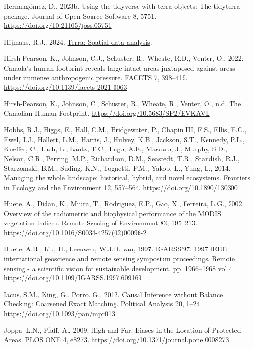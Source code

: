 \documentclass[
]{agujournal2019}
\newlength{\cslhangindent}
\newenvironment{CSLReferences}[2] %
 {\begin{list}{}{%
  \setlength{\itemindent}{0pt}
  \setlength{\leftmargin}{0pt}
  \setlength{\parsep}{0pt}
  \ifodd #1
   \setlength{\leftmargin}{\cslhangindent}
   \setlength{\itemindent}{-1\cslhangindent}
  \fi
  \setlength{\itemsep}{#2\baselineskip}}}
 {\end{list}}
\begin{document}
\begin{CSLReferences}{1}{0}
Hernangómez, D., 2023b. Using the {tidyverse} with {terra} objects: The
{tidyterra} package. Journal of Open Source Software 8, 5751.
\url{https://doi.org/10.21105/joss.05751}

Hijmans, R.J., 2024. \href{https://rspatial.org/}{Terra: Spatial data
analysis}.

Hirsh-Pearson, K., Johnson, C.J., Schuster, R., Wheate, R.D., Venter,
O., 2022. Canada{'}s human footprint reveals large intact areas
juxtaposed against areas under immense anthropogenic pressure. FACETS 7,
398--419. \url{https://doi.org/10.1139/facets-2021-0063}

Hirsh-Pearson, K., Johnson, C., Schuster, R., Wheate, R., Venter, O.,
n.d. The Canadian Human Footprint.
\url{https://doi.org/10.5683/SP2/EVKAVL}

Hobbs, R.J., Higgs, E., Hall, C.M., Bridgewater, P., Chapin III, F.S.,
Ellis, E.C., Ewel, J.J., Hallett, L.M., Harris, J., Hulvey, K.B.,
Jackson, S.T., Kennedy, P.L., Kueffer, C., Lach, L., Lantz, T.C., Lugo,
A.E., Mascaro, J., Murphy, S.D., Nelson, C.R., Perring, M.P.,
Richardson, D.M., Seastedt, T.R., Standish, R.J., Starzomski, B.M.,
Suding, K.N., Tognetti, P.M., Yakob, L., Yung, L., 2014. Managing the
whole landscape: historical, hybrid, and novel ecosystems. Frontiers in
Ecology and the Environment 12, 557--564.
\url{https://doi.org/10.1890/130300}

Huete, A., Didan, K., Miura, T., Rodriguez, E.P., Gao, X., Ferreira,
L.G., 2002. Overview of the radiometric and biophysical performance of
the MODIS vegetation indices. Remote Sensing of Environment 83,
195--213. \url{https://doi.org/10.1016/S0034-4257(02)00096-2}

Huete, A.R., Liu, H., Leeuwen, W.J.D. van, 1997. IGARSS'97. 1997 IEEE
international geoscience and remote sensing symposium proceedings.
Remote sensing - a scientific vision for sustainable development. pp.
1966--1968 vol.4. \url{https://doi.org/10.1109/IGARSS.1997.609169}

Iacus, S.M., King, G., Porro, G., 2012. Causal Inference without Balance
Checking: Coarsened Exact Matching. Political Analysis 20, 1--24.
\url{https://doi.org/10.1093/pan/mpr013}

Joppa, L.N., Pfaff, A., 2009. High and Far: Biases in the Location of
Protected Areas. PLOS ONE 4, e8273.
\url{https://doi.org/10.1371/journal.pone.0008273}


\end{CSLReferences}
\end{document}
